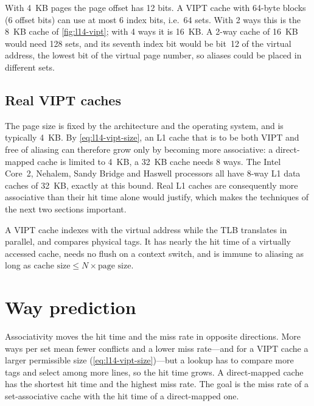 \documentclass[../main.tex]{subfiles}
\begin{document}
\begin{example}
  \label{ex:l14-vipt-size}
  With 4~KB pages the page offset has 12 bits.  A VIPT cache with 64-byte
  blocks (6 offset bits) can use at most 6 index bits, i.e.\ 64 sets.  With 2
  ways this is the 8~KB cache of \cref{fig:l14-vipt}; with 4 ways it is
  16~KB.  A 2-way cache of 16~KB would need 128 sets, and its seventh index
  bit would be bit~12 of the virtual address, the lowest bit of the virtual
  page number, so aliases could be placed in different sets.
\end{example}

\subsection{Real VIPT caches}

The page size is fixed by the architecture and the operating system, and is
typically 4~KB.  By \cref{eq:l14-vipt-size}, an L1 cache that is to be both
VIPT and free of aliasing can therefore grow only by becoming more
associative: a direct-mapped cache is limited to 4~KB, a 32~KB cache needs 8
ways.  The Intel Core~2, Nehalem, Sandy Bridge and Haswell processors all
have 8-way L1 data caches of 32~KB, exactly at this bound.  Real L1 caches
are consequently more associative than their hit time alone would justify,
which makes the techniques of the next two sections important.

\begin{keypoint}
  A VIPT cache indexes with the virtual address while the TLB translates in
  parallel, and compares physical tags.  It has nearly the hit time of a
  virtually accessed cache, needs no flush on a context switch, and is immune
  to aliasing as long as $\text{cache size} \le N \times \text{page size}$.
\end{keypoint}

\section{Way prediction}
\label{sec:l14-way-prediction}

Associativity moves the hit time and the miss rate in opposite
directions.  More ways per set
mean fewer conflicts and a lower miss rate---and for a VIPT cache a larger
permissible size (\cref{eq:l14-vipt-size})---but a lookup has to compare more
tags and select among more lines, so the hit time grows.  A direct-mapped
cache has the shortest hit time and the highest miss rate.  The goal is the
miss rate of a set-associative cache with the hit time of a direct-mapped one.
\end{document}
